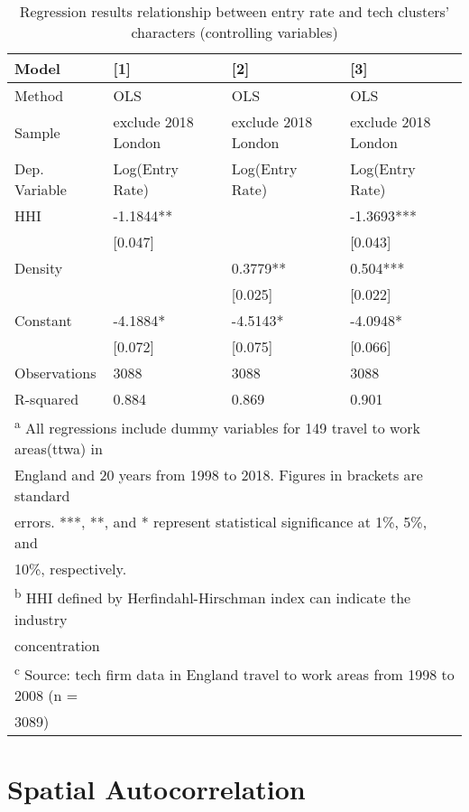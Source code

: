 \documentclass[
  12pt,
  oneside]{book}
\begin{document}
\begin{table}

\caption{\label{tab:tab-regression-control-var}Regression results relationship between entry rate and tech clusters' characters (controlling variables)}
\centering
\begin{tabular}[t]{llll}
\toprule
\textbf{Model} & \textbf{{}[1]} & \textbf{{}[2]} & \textbf{{}[3]}\\
\midrule
Method & OLS & OLS & OLS\\
Sample & exclude 2018 London & exclude 2018 London & exclude 2018 London\\
Dep. Variable & Log(Entry Rate) & Log(Entry Rate) & Log(Entry Rate)\\
\midrule
HHI & -1.1844** &  & -1.3693***\\
 & {}[0.047] &  & {}[0.043]\\
\addlinespace
Density &  & 0.3779** & 0.504***\\
 &  & {}[0.025] & {}[0.022]\\
Constant & -4.1884* & -4.5143* & -4.0948*\\
 & {}[0.072] & {}[0.075] & {}[0.066]\\
\midrule
Observations & 3088 & 3088 & 3088\\
\addlinespace
R-squared & 0.884 & 0.869 & 0.901\\
\bottomrule
\multicolumn{4}{l}{\textsuperscript{a} All regressions include dummy variables for 149 travel to work areas(ttwa) in}\\
\multicolumn{4}{l}{England and 20 years from 1998 to 2018. Figures in brackets are standard}\\
\multicolumn{4}{l}{errors. ***, **, and * represent statistical significance at 1\%, 5\%, and}\\
\multicolumn{4}{l}{10\%, respectively.}\\
\multicolumn{4}{l}{\textsuperscript{b} HHI defined by Herfindahl-Hirschman index can indicate the industry}\\
\multicolumn{4}{l}{concentration}\\
\multicolumn{4}{l}{\textsuperscript{c} Source: tech firm data in England travel to work areas from 1998 to 2008 (n =}\\
\multicolumn{4}{l}{3089)}\\
\end{tabular}
\end{table}

\hypertarget{spatial-autocorrelation}{%
\section{Spatial Autocorrelation}\label{spatial-autocorrelation}}
\end{document}
